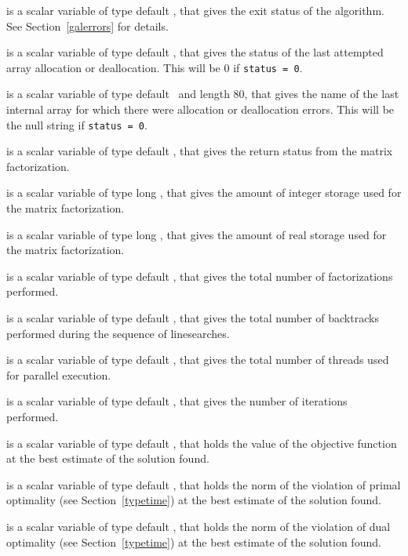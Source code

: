 \documentclass{galahad}
\begin{document}
\begin{description}

 is a scalar variable of type default \integer, that gives the
exit status of the algorithm.
See Section~\ref{galerrors}
for details.

 is a scalar variable of type default \integer, that gives
the status of the last attempted array allocation or deallocation.
This will be 0 if {\tt status = 0}.

 is a scalar variable of type default \character\
and length 80, that  gives the name of the last internal array
for which there were allocation or deallocation errors.
This will be the null string if {\tt status = 0}.

 is a scalar variable of type default \integer, that
gives the return status from the matrix factorization.

 is a scalar variable of type long
\integer, that gives the amount of integer storage used for the matrix
factorization.

 is a scalar variable of type long \integer,
that gives the amount of real storage used for the matrix factorization.

 is a scalar variable of type default \integer, that gives the
total number of factorizations performed.

 is a scalar variable of type default \integer, that gives the
total number of backtracks performed during the sequence of linesearches.

 is a scalar variable of type default \integer, that gives the
total number of threads used for parallel execution.

 is a scalar variable of type default \integer, that
gives the number of iterations performed.

 is a scalar variable of type default \realdp, that holds the
value of the objective function at the best estimate of the solution found.

 is a scalar variable of type default \realdp,
that holds the norm of the violation of primal optimality
(see Section~\ref{typetime}) at the best estimate of the solution found.

 is a scalar variable of type default \realdp,
that holds the norm of the violation of dual optimality
(see Section~\ref{typetime}) at the best estimate of the solution found.


\end{description}
\end{document}
